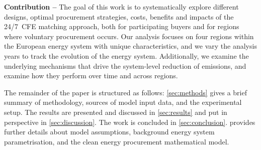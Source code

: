 
\textbf{Contribution --} The goal of this work is to systematically explore different designs, optimal procurement strategies, costs, benefits and impacts of the 24/7~CFE matching approach, both for participating buyers and for regions where voluntary procurement occurs.
Our analysis focuses on four regions within the European energy system with unique characteristics, and we vary the analysis years to track the evolution of the energy system.
Additionally, we examine the underlying mechanisms that drive the system-level reduction of \co emissions, and examine how they perform over time and across regions.


The remainder of the paper is structured as follows: \cref{sec:methods} gives a brief summary of methodology, sources of model input data, and the experimental setup. 
The results are presented and discussed in \cref{sec:results} and put in perspective in \cref{sec:discussion}. 
The work is concluded in \cref{sec:conclusion}. 
 provides further details about model assumptions, background energy system parametrisation, and the clean energy procurement mathematical model.
